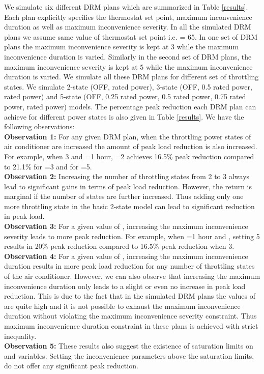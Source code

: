 \documentclass[10pt,twocolumn,twoside]{IEEEtran}
\begin{document}
We simulate six different DRM plans which are summarized in Table \ref{results}. Each plan explicitly specifies the thermostat set point, maximum inconvenience duration as well as maximum inconvenience severity. In all the simulated DRM plans we assume same value of thermostat set point i.e.  = 65. In one set of DRM plans the maximum inconvenience severity is kept at 3 while the maximum inconvenience duration is varied. Similarly in the second set of DRM plans, the maximum inconvenience severity is kept at 5 while the maximum inconvenience duration is varied. We simulate all these DRM plans for different set of throttling states. We simulate 2-state (OFF, rated power), 3-state (OFF, 0.5  rated power, rated power) and 5-state (OFF, 0.25  rated power, 0.5  rated power, 0.75  rated power, rated power) models. The percentage peak reduction each DRM plan can achieve for different power states is also given in Table \ref{results}. We have the following observations:\\
\textbf{Observation 1:} For any given DRM plan, when the throttling power states of air conditioner are increased the amount of peak load reduction is also increased. For example, when 3 and =1 hour, =2 achieves 16.5\% peak reduction compared to 21.1\% for =3 and  for =5. \\
\textbf{Observation 2:} Increasing the number of throttling states from 2 to 3 always lead to significant gains in terms of peak load reduction. However, the return is marginal if the number of states are further increased. Thus adding only one more throttling state in the basic 2-state model can lead to significant reduction in peak load. \\
\textbf{Observation 3:} For a given value of , increasing the maximum inconvenience severity leads to more peak reduction. For example, when =1 hour and , setting 5 results in 20\% peak reduction compared to 16.5\% peak reduction when 3. \\
\textbf{Observation 4:} For a given value of , increasing the maximum inconvenience duration results in more peak load reduction for any number of throttling states of the air conditioner. However, we can also observe that increasing the maximum inconvenience duration only leads to a slight or even no increase in peak load reduction. This is due to the fact that in the simulated DRM plans the values of  are quite high and it is not possible to exhaust the maximum inconvenience duration without violating the maximum inconvenience severity constraint. Thus maximum inconvenience duration constraint in these plans is achieved with strict inequality. \\
\textbf{Observation 5:} These results also suggest the existence of saturation limits on  and  variables. Setting the inconvenience parameters above the saturation limits, do not offer any significant peak reduction. 
\end{document}
